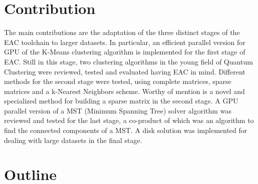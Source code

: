 \section{Contribution}
The main contributions are the adaptation of the three distinct stages of the EAC toolchain to larger datasets.
In particular, an efficient parallel version for GPU of the K-Means clustering algorithm is implemented for the first stage of EAC.
Still in this stage, two clustering algorithms in the young field of Quantum Clustering were reviewed, tested and evaluated having EAC in mind. %
Different methods for the second stage were tested, using complete matrices, sparse matrices and a k-Nearest Neighbors scheme.
Worthy of mention is a novel and specialized method for building a sparse matrix in the second stage. %
A GPU parallel version of a MST (Minimum Spanning Tree) solver algorithm was reviewed and tested for the last stage, a co-product of which was an algorithm to find the connected components of a MST.
A disk solution was implemented for dealing with large datasets in the final stage.






\section{Outline}

